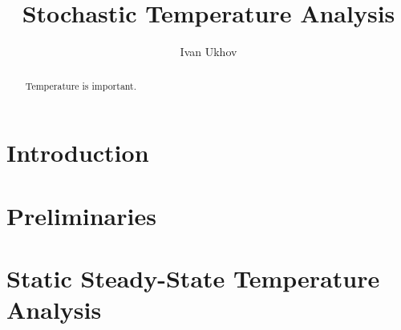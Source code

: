 \documentclass[conference]{IEEEtran}
\begin{document}
  \title{Stochastic Temperature Analysis}
  \author{Ivan Ukhov}

  \maketitle

  \begin{abstract}
    Temperature is important.
  \end{abstract}

  \section{Introduction}  
  

  \section{Preliminaries}
  



  \section{Static Steady-State Temperature Analysis} 
  

  
  
\end{document}
